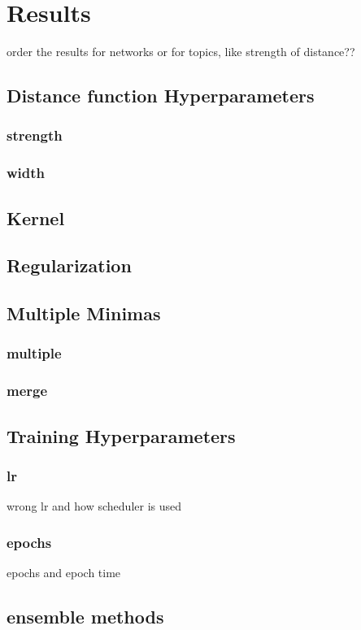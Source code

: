 \chapter{Results}
order the results for networks or for topics, like strength of distance??

\section{Distance function Hyperparameters}
\subsection{strength}
\subsection{width}

\section{Kernel}

\section{Regularization}

\section{Multiple Minimas}
\subsection{multiple}
\subsection{merge}

\section{Training Hyperparameters}
\subsection{lr}\label{res:Learning rate}
wrong lr and how scheduler is used
\subsection{epochs}\label{res:Epochs}
epochs and epoch time

\section{ensemble methods}
